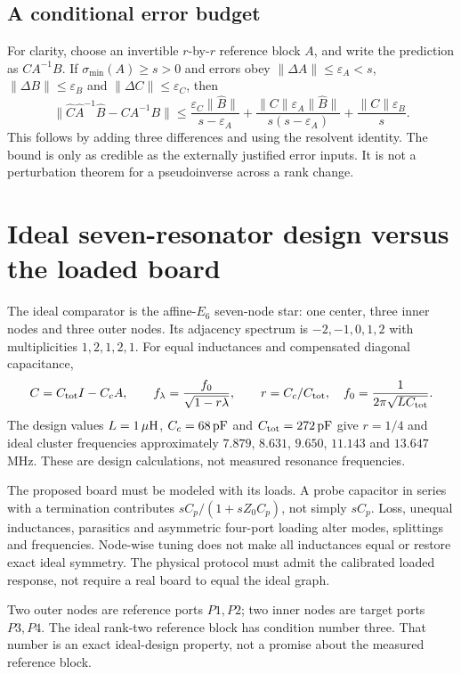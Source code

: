 \documentclass[11pt]{article}
\begin{document}
\subsection{A conditional error budget}
For clarity, choose an invertible $r$-by-$r$ reference block $A$, and write
the prediction as $CA^{-1}B$. If
$\sigma_{\min}(A)\geq s>0$ and errors obey
$\|\Delta A\|\leq\varepsilon_A<s$,
$\|\Delta B\|\leq\varepsilon_B$ and
$\|\Delta C\|\leq\varepsilon_C$, then
\[
 \|\widehat C\widehat A^{-1}\widehat B-CA^{-1}B\|
 \leq
 \frac{\varepsilon_C\|\widehat B\|}{s-\varepsilon_A}
 +\frac{\|C\|\varepsilon_A\|\widehat B\|}{s(s-\varepsilon_A)}
 +\frac{\|C\|\varepsilon_B}{s}.
\]
This follows by adding three differences and using the resolvent identity.
The bound is only as credible as the externally justified error inputs.
It is not a perturbation theorem for a pseudoinverse across a rank change.

\section{Ideal seven-resonator design versus the loaded board}
The ideal comparator is the affine-$E_6$ seven-node star: one center, three
inner nodes and three outer nodes. Its adjacency spectrum is
$-2,-1,0,1,2$ with multiplicities $1,2,1,2,1$.
For equal inductances and compensated diagonal capacitance,
\[
 C=C_{\rm tot}I-C_cA,\qquad
 f_\lambda=\frac{f_0}{\sqrt{1-r\lambda}},\qquad
 r=C_c/C_{\rm tot},\quad
 f_0=\frac1{2\pi\sqrt{LC_{\rm tot}}}.
\]
The design values $L=1\,\mu{\rm H}$, $C_c=68\,{\rm pF}$ and
$C_{\rm tot}=272\,{\rm pF}$ give $r=1/4$ and ideal cluster frequencies
approximately $7.879$, $8.631$, $9.650$, $11.143$ and $13.647$ MHz.
These are design calculations, not measured resonance frequencies.

The proposed board must be modeled with its loads. A probe capacitor in series with a
termination contributes $sC_p/(1+sZ_0C_p)$, not simply $sC_p$.
Loss, unequal inductances, parasitics and asymmetric four-port loading
alter modes, splittings and frequencies. Node-wise tuning does not make
all inductances equal or restore exact ideal symmetry.
The physical protocol must admit the calibrated loaded response, not
require a real board to equal the ideal graph.

Two outer nodes are reference ports $P1,P2$; two inner nodes are
target ports $P3,P4$. The ideal rank-two reference block has condition
number three. That number is an exact ideal-design property, not a
promise about the measured reference block.
\end{document}
